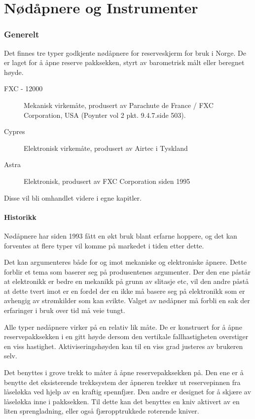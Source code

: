 \part{Nødåpnere og Instrumenter}

\section{Generelt}
Det finnes tre typer godkjente nødåpnere for reserveskjerm for bruk i Norge. De er laget for å åpne reserve pakksekken, styrt av barometrisk målt eller beregnet høyde.
\begin{description}
\item[FXC - 12000] Mekanisk virkemåte, produsert av Parachute de France / FXC Corporation, USA (Poynter vol 2 pkt. 9.4.7.side 503).
\item[Cypres] Elektronisk virkemåte, produsert av Airtec i Tyskland
\item[Astra] Elektronisk, produsert av FXC Corporation siden 1995
\end{description}

Disse vil bli omhandlet videre i egne kapitler.

\subsection{Historikk}
Nødåpnere har siden 1993 fått en økt bruk blant erfarne hoppere, og det kan forventes at flere typer vil komme på markedet i tiden etter dette.

Det kan argumenteres både for og imot mekaniske og elektroniske åpnere. Dette forblir et tema som baserer seg på produsentenes argumenter. Der den ene påstår at elektronikk er bedre en mekanikk på grunn av slitasje etc, vil den andre påstå at dette tvert imot er en fordel der en ikke må basere seg på elektronikk som er avhengig av strømkilder som kan svikte. Valget av nødåpner må forbli en sak der erfaringer i bruk over tid må veie tungt.

Alle typer nødåpnere virker på en relativ lik måte. De er konstruert for å åpne reservepakksekken i en gitt høyde dersom den vertikale fallhastigheten overstiger en viss hastighet. Aktiviseringshøyden kan til en viss grad justeres av brukeren selv.

Det benyttes i grove trekk to måter å åpne reservepakksekken på. Den ene er å benytte det eksisterende trekksystem der åpneren trekker ut reservepinnen fra låseløkka ved hjelp av en kraftig spennfjær. Den andre er designet for å skjære av låseløkka inne i pakksekken. Til dette kan det benyttes en kniv aktivert av en liten sprengladning, eller også fjæropptrukkede roterende kniver.

